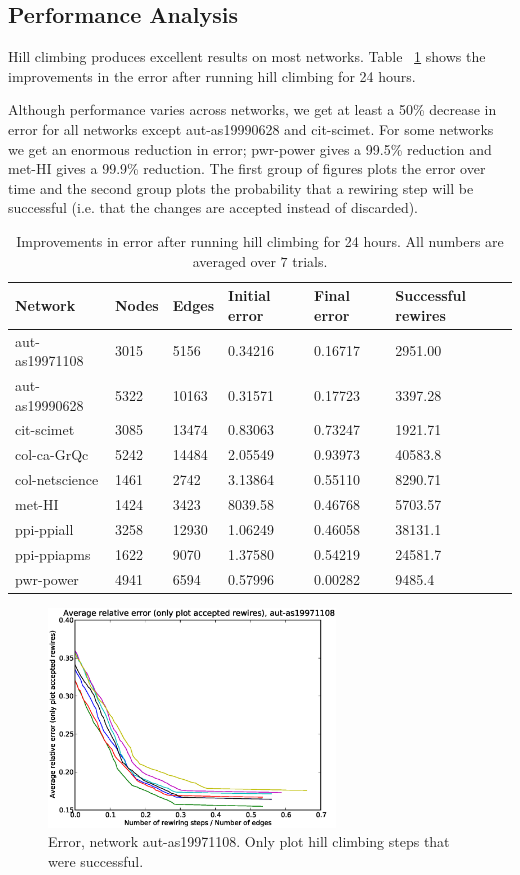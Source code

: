 \subsection{Performance Analysis}

Hill climbing produces excellent results on most networks.  Table ~\ref{table:errors} shows the improvements in the error after running hill climbing for 24 hours.

Although performance varies across networks, we get at least a 50\% decrease in error for all networks except aut-as19990628 and cit-scimet.  For some networks we get an enormous reduction in error; pwr-power gives a 99.5\% reduction and met-HI gives a 99.9\% reduction.  The first group of figures plots the error over time and the second group plots the probability that a rewiring step will be successful (i.e. that the changes are accepted instead of discarded).

\begin{table}[t]
\centering
\begin{tabular}{| l | l | l | | l | l | l |}
\hline
Network & Nodes & Edges & Initial error & Final error & Successful rewires\\ \hline
aut-as19971108 & 3015 & 5156 & 0.34216 & 0.16717 & 2951.00\\\hline
aut-as19990628 & 5322 & 10163 & 0.31571 & 0.17723 & 3397.28\\\hline
cit-scimet & 3085 & 13474 & 0.83063 & 0.73247 & 1921.71\\\hline
col-ca-GrQc & 5242 & 14484 & 2.05549 & 0.93973 & 40583.8\\\hline
col-netscience & 1461 & 2742 & 3.13864 & 0.55110 & 8290.71\\\hline
met-HI & 1424 & 3423 & 8039.58 & 0.46768 & 5703.57\\\hline
ppi-ppiall & 3258 & 12930 & 1.06249 & 0.46058 & 38131.1\\\hline
ppi-ppiapms & 1622 & 9070 & 1.37580 & 0.54219 & 24581.7\\\hline
pwr-power & 4941 & 6594 & 0.57996 & 0.00282 & 9485.4\\\hline
\end{tabular}
\caption{Improvements in error after running hill climbing for 24 hours.  All numbers are averaged over $7$ trials.}
\label{table:errors}
\end{table}

\begin{figure}[p]
\centering
\includegraphics[width=3in]{Figures/acceptedOnly-aut-as19971108.eps}
\caption{Error, network aut-as19971108.  Only plot hill climbing steps that were successful.}
\label{fig:errors-aut-as19971108}
\end{figure}

